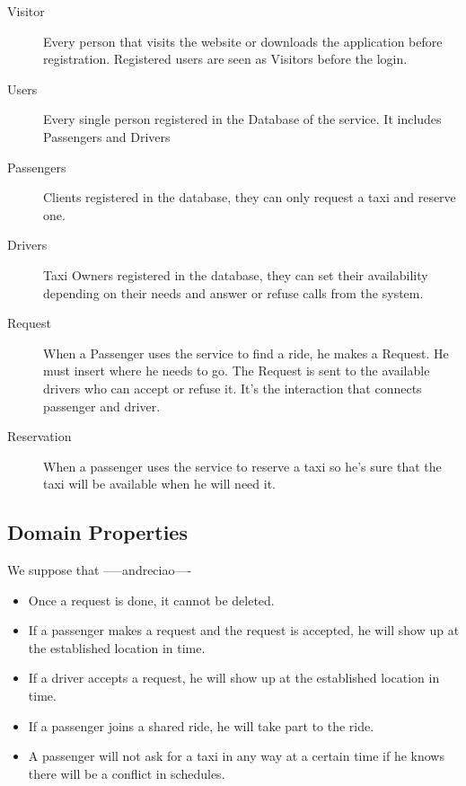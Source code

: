 \documentclass[a4paper, 12pt, titlepage]{article}
\begin{document}
\begin{description}
	\item[Visitor] Every person that visits the website or downloads the application before registration. Registered users are seen as Visitors before the login.
	\item[Users] Every single person registered in the Database of the service. It includes Passengers and Drivers
	\item[Passengers] Clients registered in the database, they can only request a taxi and reserve one.  
	\item[Drivers]	Taxi Owners registered in the database, they can set their availability depending on their needs and answer or refuse calls from the system.
	\item[Request] When a Passenger uses the service to find a ride, he makes a Request. He must insert where he needs to go. The Request is sent to the available drivers who can accept or refuse it. It's the 			interaction that connects passenger and driver. 
	\item[Reservation] When a passenger uses the service to reserve a taxi so he's sure that the taxi will be available when he will need it.
	
\end{description}

\subsection{Domain Properties}
We suppose that -----andreciao----
\begin{itemize}
	\item Once a request is done, it cannot be deleted.
	\item If a passenger makes a request and the request is accepted, he will show up at the established location in time.
	\item If a driver accepts a request, he will show up at the established location in time.
	\item If a passenger joins a shared ride, he will take part to the ride.
	\item A passenger will not ask for a taxi in any way at a certain time if he knows there will be a conflict in schedules.
\end{itemize}
\end{document}
